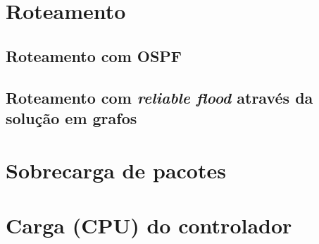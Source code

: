 \section{Roteamento}

\subsection{Roteamento com OSPF}
\subsection{Roteamento com \emph{reliable flood} através da solução em grafos}


\section{Sobrecarga de pacotes}


\section{Carga (CPU) do controlador}
